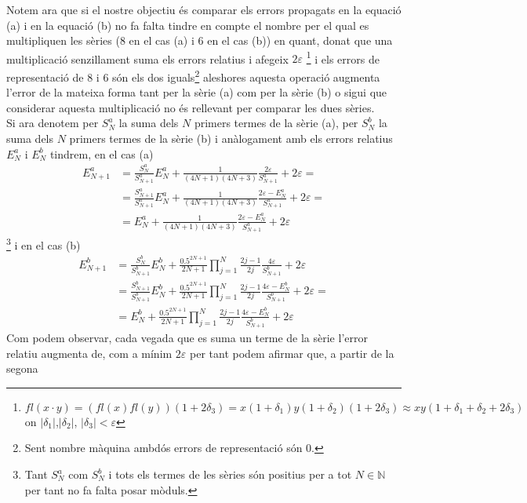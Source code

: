 \documentclass[a4paper,10pt]{article}
\renewcommand{\*}{\cdot}
\renewcommand{\epsilon}{\varepsilon}
\begin{document}
Notem ara que si el nostre objectiu és comparar els errors propagats en la equació (a) i en la equació (b) no fa falta tindre en compte el nombre per el qual es 
multipliquen les sèries (8 en el cas (a) i 6 en el cas (b)) en quant, donat que una multiplicació senzillament suma els errors relatius i afegeix $2\epsilon$
\footnote{$fl(x\*y)=(fl(x)fl(y))(1+2\delta_3)=x(1+\delta_1)y(1+\delta_2)(1+2\delta_3)\approx xy(1+\delta_1+\delta_2+2\delta_3)$ on $|\delta_1|$,$|\delta_2|$,
$|\delta_3|<\epsilon$} i els errors de representació de 8 i 6 són els dos iguals\footnote{Sent nombre màquina ambdós errors de representació són 0.} aleshores aquesta 
operació augmenta l'error de la mateixa forma tant per la sèrie (a) com per la sèrie (b) o sigui que considerar aquesta multiplicació no és rellevant per comparar les dues
sèries.\\
Si ara denotem per $S_N^a$ la suma dels $N$ primers termes de la sèrie (a), per $S_N^b$ la suma dels $N$ primers termes de la sèrie (b) i anàlogament
amb els errors relatius $E_N^a$ i $E_N^b$ tindrem, en el cas (a)
\begin{equation}
\label{a}
\begin{split}
 E_{N+1}^a&=\frac{S_N^a}{S_{N+1}^a}E_N^a+\frac{1}{(4N+1)(4N+3)}\frac{2\epsilon}{S^a_{N+1}}+2\epsilon=\\
 &=\frac{S_{N+1}^a}{S_{N+1}^a}E_N^a+\frac{1}{(4N+1)(4N+3)}\frac{2\epsilon-E_N^a}{S^a_{N+1}}+2\epsilon=\\
 &=E_N^a+\frac{1}{(4N+1)(4N+3)}\frac{2\epsilon-E_N^a}{S^a_{N+1}}+2\epsilon
 \end{split}
\end{equation}\footnote{Tant $S^a_N$ com $S^b_N$ i tots els termes de les sèries són positius per a tot $N\in\mathbb{N}$ per tant no fa falta posar mòduls.}
i en el cas (b)
\begin{equation}
\label{b}
\begin{split}
 E_{N+1}^b&=\frac{S_N^b}{S_{N+1}^b}E_N^b+\frac{0.5^{2N+1}}{2N+1}
 \prod_{j=1}^N\frac{2j-1}{2j}\frac{4\epsilon}{S^b_{N+1}}+2\epsilon\\
 &=\frac{S_{N+1}^b}{S_{N+1}^b}E_N^b+\frac{0.5^{2N+1}}{2N+1}
 \prod_{j=1}^N\frac{2j-1}{2j}\frac{4\epsilon-E_N^b}{S^b_{N+1}}+2\epsilon=\\
 &=E_N^b+\frac{0.5^{2N+1}}{2N+1}
 \prod_{j=1}^N\frac{2j-1}{2j}\frac{4\epsilon-E_N^b}{S^b_{N+1}}+2\epsilon
 \end{split}
\end{equation}
Com podem observar, cada vegada que es suma un terme de la sèrie l'error relatiu augmenta de, com a mínim $2\epsilon$ per tant podem afirmar que, a partir de la segona
\end{document}
